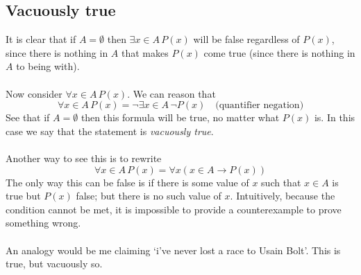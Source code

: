 \documentclass{report}
\begin{document}
\subsection{Vacuously true}
It is clear that if $A=\emptyset$ then $\exists x\in A\,P(x)$ will be false regardless of $P(x)$, since there is nothing in $A$ that makes $P(x)$ come true 
(since there is nothing in $A$ to being with).\\
\vspace{1mm}\\
Now consider $\forall x\in A\,P(x)$. We can reason that
\begin{equation*}
\forall x\in A\,P(x)=\neg\exists x\in A\,\neg P(x)\quad\text{(quantifier negation)}
\end{equation*}
See that if $A=\emptyset$ then this formula will be true, no matter what $P(x)$ is. In this case we say that the statement is \textit{vacuously true}.\\
\vspace{1mm}\\
Another way to see this is to rewrite
\begin{equation*}
\forall x\in A\,P(x)=\forall x(x\in A\to P(x))
\end{equation*}
The only way this can be false is if there is some value of $x$ such that $x\in A$ is true but $P(x)$ false; but there is no such value of $x$.
Intuitively, because the condition cannot be met, it is impossible to provide a counterexample to prove something wrong.\\
\vspace{1mm}\\
An analogy would be me claiming `i've never lost a race to Usain Bolt'. This is true, but vacuously so.
\newpage
\end{document}
